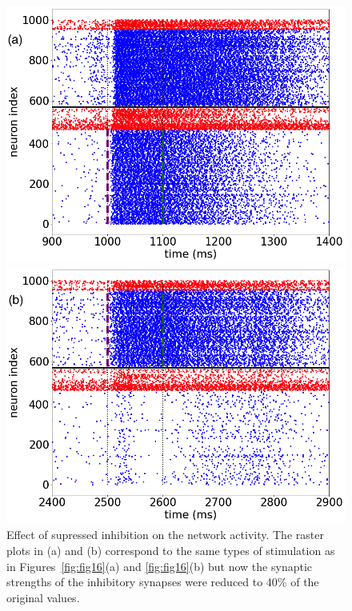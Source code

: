 \begin{figure}[H]
    \centering
    \begin{minipage}[b]{0.45\textwidth}
    \includegraphics[scale=0.25]{Figures/Fig17a.png}
    \end{minipage}
    \hfill
    \begin{minipage}[b]{0.5\textwidth}
        \includegraphics[scale=0.25]{Figures/Fig17b.png}
    \end{minipage}
    \caption{Effect of supressed inhibition on the network activity. The raster plots in (a) and (b) correspond to the same types of stimulation as in Figures~\ref{fig:fig16}(a) and \ref{fig:fig16}(b) but now the synaptic strengths of the inhibitory synapses were reduced to 40\% of the original values.}
    \label{fig:fig17}
\end{figure}

